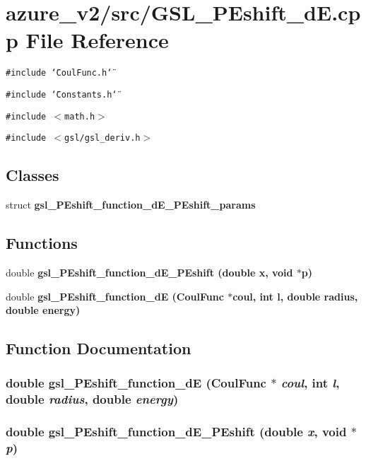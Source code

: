 \section{azure\_\-v2/src/GSL\_\-PEshift\_\-d\-E.cpp File Reference}
\label{GSL__PEshift__dE_8cpp}
{\tt \#include \char`\"{}Coul\-Func.h\char`\"{}}\par
{\tt \#include \char`\"{}Constants.h\char`\"{}}\par
{\tt \#include $<$math.h$>$}\par
{\tt \#include $<$gsl/gsl\_\-deriv.h$>$}\par
\subsection*{Classes}
\begin{CompactItemize}
\item 
struct \bf{gsl\_\-PEshift\_\-function\_\-d\-E\_\-PEshift\_\-params}
\end{CompactItemize}
\subsection*{Functions}
\begin{CompactItemize}
\item 
double \bf{gsl\_\-PEshift\_\-function\_\-d\-E\_\-PEshift} (double x, void $\ast$p)
\item 
double \bf{gsl\_\-PEshift\_\-function\_\-d\-E} (\bf{Coul\-Func} $\ast$coul, int l, double radius, double energy)
\end{CompactItemize}


\subsection{Function Documentation}
\subsubsection{\setlength{\rightskip}{0pt plus 5cm}double gsl\_\-PEshift\_\-function\_\-d\-E (\bf{Coul\-Func} $\ast$ {\em coul}, int {\em l}, double {\em radius}, double {\em energy})}\label{GSL__PEshift__dE_8cpp_4a6261a0ed68308e8798c9a96bebc64a}


\subsubsection{\setlength{\rightskip}{0pt plus 5cm}double gsl\_\-PEshift\_\-function\_\-d\-E\_\-PEshift (double {\em x}, void $\ast$ {\em p})}\label{GSL__PEshift__dE_8cpp_df1a86d5ed62a2472045dadda1d5b6b3}


